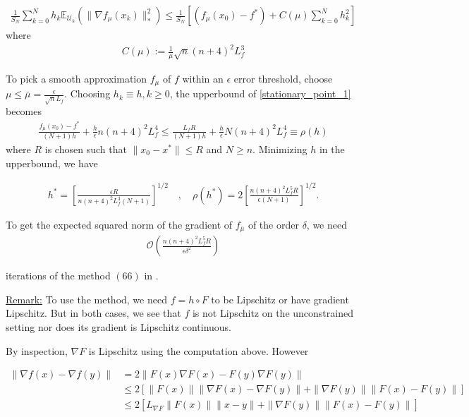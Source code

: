 \documentclass{article}
\begin{document}
\begin{align}
\frac{1}{S_N}\sum_{k=0}^Nh_k\mathbb{E}_{\mathcal{U}_k}(\|\nabla f_{\mu}(x_k)\|_*^2) \leq \frac{1}{S_N}\left[(f_{\mu}(x_0) - f^*) + C(\mu)\sum_{k=0}^{N}h_k^2\right] \label{stationary_point_1}
\end{align}
where
\begin{align}
C(\mu):= \frac{1}{\mu}\sqrt{n}(n+4)^2L_f^3
\end{align}

To pick a smooth approximation $f_{\mu}$ of $f$ within an $\epsilon$ error threshold, choose $\mu \leq \bar{\mu} = \frac{\epsilon}{\sqrt{n}L_f}$. Choosing $h_k \equiv h, k \geq 0$, the upperbound of \eqref{stationary_point_1} becomes 
\begin{align}
\frac{f_{\bar{\mu}}(x_0)-f^*}{(N+1)h} + \frac{h}{\epsilon}n(n+4)^2L_f^4 \leq \frac{L_fR}{(N+1)h} + \frac{h}{\epsilon}N(n+4)^2L_f^4 \equiv \rho(h)
\end{align}
where $R$ is chosen such that $\|x_0 - x^*\| \leq R$ and $N \geq n$. Minimizing $h$ in the upperbound, we have 

\begin{align*}
h^* = \left[\frac{\epsilon R}{n(n+4)^2L_f^3(N+1)}\right]^{1/2} \quad , \quad \rho(h^*) = 2\left[\frac{n(n+4)^2L_f^5R}{\epsilon(N+1)}\right]^{1/2}.
\end{align*}

To get the expected squared norm of the gradient of $f_{\bar{\mu}}$ of the order $\delta$, we need 
\begin{align}
\mathcal{O}\left(\frac{n(n+4)^2L_f^5R}{\epsilon \delta^2}\right)
\end{align}

iterations of the method $(66)$ in \cite{Nesterov2015}. \newline 

\underline{Remark:} To use the method, we need $f = h \circ F$ to be Lipschitz or have gradient Lipschitz. But in both cases, we see that $f$ is not Lipschitz on the unconstrained setting nor does its gradient is Lipschitz continuous. \newline

By inspection, $\nabla F$ is Lipschitz using the computation above. However

\begin{align}
\| \nabla f(x) - \nabla f(y)\| & = 2\| F(x)\nabla F(x) - F(y)\nabla F(y)\|  \\ & \leq 2\left[\|F(x)\| \| \nabla F(x) - \nabla F(y)\| + \| \nabla F(y)\| \|F(x) - F(y)\|\right] \\ & \leq 2\left[L_{\nabla F}\|F(x)\| \|x-y\| + \|\nabla F(y)\| \|F(x) - F(y)\| \right] \label{grad_lipschitz_nonconvex_opt}
\end{align}
\end{document}
